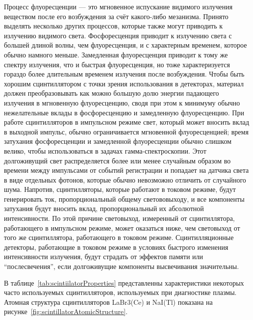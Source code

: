Процесс флуоресценции --- это мгновенное испускание видимого излучения веществом после его возбуждения за счёт какого-либо мезанизма. Принято выделять несколько других процессов, которые также могут приводить к излучению видимого света. Фосфоресценция приводит к излучению света с большей длиной волны, чем флуоресценция, и с характерным временем, которое обычно намного меньше. Замедленная флуоресценция приводит к тому же спектру излучения, что и быстрая флуоресценция, но тоже характеризуется гораздо более длительным временем излучения после возбуждения. Чтобы быть хорошим сцинтиллятором с точки зрения использования в детекторах, материал должен преобразовывать как можно большую долю энергии падающего излучения в мгновенную флуоресценцию, сводя при этом к минимуму обычно нежелательные вклады в фосфоресценцию и замедленную флуоресценцию. При работе сцинтилляторов в импульсном режиме свет, который может вносить вклад в выходной импульс, обычно ограничивается мгновенной флуоресценцией; время затухания фосфоресценции и замедленной флуоресценции обычно слишком велико, чтобы использоваться в задачах гамма-спектроскопии. Этот долгоживущий свет распределяется более или менее случайным образом во времени между импульсами от событий регистрации и попадает на датчика света в виде отдельных фотонов, которые обычно невозможно отличить от случайного шума. Напротив, сцинтилляторы, которые работают в токовом режиме, будут генерировать ток, пропорциональный общему светововыходу, и все компоненты затухания будут вносить вклад, пропорциональный их абсолютной интенсивности. По этой причине световыход, измеренный от сцинтиллятора, работающего в импульсном режиме, может оказаться ниже, чем световыход от того же сцинтиллятора, работающего в токовом режиме. Сцинтилляционные детекторы, работающие в токовом режиме в условиях быстрого изменения интенсивности излучения, будут страдать от эффектов памяти или ``послесвечения'', если долгоживущие компоненты высвечивания значительны.~\cite{Knoll2010}

В таблице~\ref{tab:scintiilatorProperties} представленны характеристики некоторых часто используемых сцинтилляторов, используемых при диагностике плазмы. Атомная структура сцинтилляторов LaBr3(Ce) и NaI(Tl) показана на рисунке~\ref{fig:scintillatorAtomicStructure}.

